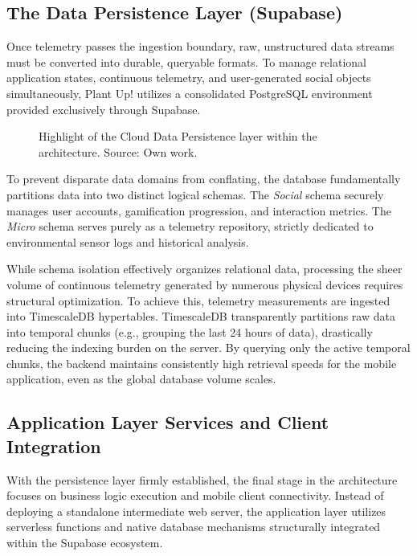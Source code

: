 \subsection{The Data Persistence Layer (Supabase)}

Once telemetry passes the ingestion boundary, raw, unstructured data streams must be converted into durable, queryable formats. To manage relational application states, continuous telemetry, and user-generated social objects simultaneously, Plant Up! utilizes a consolidated PostgreSQL environment provided exclusively through Supabase.

\begin{figure}[htbp]
    \centering
    \caption{Highlight of the Cloud Data Persistence layer within the architecture. Source: Own work.}
    \label{fig:persistence_layer}
\end{figure}
To prevent disparate data domains from conflating, the database fundamentally partitions data into two distinct logical schemas. The \textit{Social} schema securely manages user accounts, gamification progression, and interaction metrics. The \textit{Micro} schema serves purely as a telemetry repository, strictly dedicated to environmental sensor logs and historical analysis. 

While schema isolation effectively organizes relational data, processing the sheer volume of continuous telemetry generated by numerous physical devices requires structural optimization. To achieve this, telemetry measurements are ingested into TimescaleDB hypertables. TimescaleDB transparently partitions raw data into temporal chunks (e.g., grouping the last 24 hours of data), drastically reducing the indexing burden on the server. By querying only the active temporal chunks, the backend maintains consistently high retrieval speeds for the mobile application, even as the global database volume scales.



\subsection{Application Layer Services and Client Integration}

With the persistence layer firmly established, the final stage in the architecture focuses on business logic execution and mobile client connectivity. Instead of deploying a standalone intermediate web server, the application layer utilizes serverless functions and native database mechanisms structurally integrated within the Supabase ecosystem.

